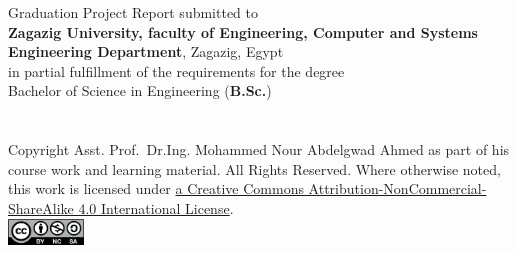 %
%
%
%
%  
%
%
%

\newpage
{Graduation Project Report submitted to\\
    \textbf{Zagazig University, faculty of Engineering, Computer and Systems Engineering Department}, Zagazig, Egypt\\
    in partial fulfillment of the requirements for the degree \\
    Bachelor of Science in Engineering (\textbf{B.Sc.})\\
    \\~\\
    
      \vspace{1cm}
    {\footnotesize
        Copyright  Asst. Prof. Dr.Ing. Mohammed Nour Abdelgwad Ahmed as part of his course work and learning material. All Rights Reserved. 
        Where otherwise noted, this work is licensed under 
        \href{https://creativecommons.org/licenses/by-nc-sa/4.0/}{ a Creative Commons Attribution-NonCommercial-ShareAlike 4.0 International License}.}\\
    \includegraphics[width=0.15\textwidth]{myFrontMatter/figures/byncsa}}\\

